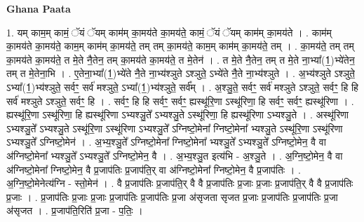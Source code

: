 \documentclass[17pt]{extarticle}
\begin{document}
\textbf{Ghana Paata } \newline

1. यम् काम॒म् कामं॒ ॅयं ॅयम् काम॑म् का॒मय॑ते का॒मय॑ते॒ कामं॒ ॅयं ॅयम् काम॑म् का॒मय॑ते । . काम॑म् का॒मय॑ते का॒मय॑ते॒ काम॒म् काम॑म् का॒मय॑ते॒ तम् तम् का॒मय॑ते॒ काम॒म् काम॑म् का॒मय॑ते॒ तम् । . का॒मय॑ते॒ तम् तम् का॒मय॑ते का॒मय॑ते॒ त मे॒ते नै॒तेन॒ तम् का॒मय॑ते का॒मय॑ते॒ त मे॒तेन॑ । . त मे॒ते नै॒तेन॒ तम् त मे॒ते ना॒भ्या᳚(1॒)भ्ये॑तेन॒ तम् त मे॒तेना॒भि । . ए॒तेना॒भ्या᳚(1॒)भ्ये॑ते नै॒ते ना॒भ्य॑श्ञुते ऽश्ञुते॒ ऽभ्ये॑ते नै॒ते ना॒भ्य॑श्ञुते । . अ॒भ्य॑श्ञुते ऽश्ञुते॒ ऽभ्या᳚(1॒)भ्य॑श्ञुते॒ सर्वꣳ॒॒ सर्व॑ मश्ञुते॒ ऽभ्या᳚(1॒)भ्य॑श्ञुते॒ सर्व᳚म् । . अ॒श्ञु॒ते॒ सर्वꣳ॒॒ सर्व॑ मश्ञुते ऽश्ञुते॒ सर्वꣳ॒॒ हि हि सर्व॑ मश्ञुते ऽश्ञुते॒ सर्वꣳ॒॒ हि । . सर्वꣳ॒॒ हि हि सर्वꣳ॒॒ सर्वꣳ॒॒ ह्यस्थू॑रि॒णा ऽस्थू॑रिणा॒ हि सर्वꣳ॒॒ सर्वꣳ॒॒ ह्यस्थू॑रिणा । . ह्यस्थू॑रि॒णा ऽस्थू॑रिणा॒ हि ह्यस्थू॑रिणा ऽभ्यश्ञु॒ते᳚ ऽभ्यश्ञु॒ते ऽस्थू॑रिणा॒ हि ह्यस्थू॑रिणा ऽभ्यश्ञु॒ते । . अस्थू॑रिणा ऽभ्यश्ञु॒ते᳚ ऽभ्यश्ञु॒ते ऽस्थू॑रि॒णा ऽस्थू॑रिणा ऽभ्यश्ञु॒ते᳚ ऽग्निष्टो॒मेना᳚ ग्निष्टो॒मेना᳚ भ्यश्ञु॒ते ऽस्थू॑रि॒णा ऽस्थू॑रिणा ऽभ्यश्ञु॒ते᳚ ऽग्निष्टो॒मेन॑ । . अ॒भ्य॒श्ञु॒ते᳚ ऽग्निष्टो॒मेना᳚ ग्निष्टो॒मेना᳚ भ्यश्ञु॒ते᳚ ऽभ्यश्ञु॒ते᳚ ऽग्निष्टो॒मेन॒ वै वा अ॑ग्निष्टो॒मेना᳚ भ्यश्ञु॒ते᳚ ऽभ्यश्ञु॒ते᳚ ऽग्निष्टो॒मेन॒ वै । . अ॒भ्य॒श्ञु॒त इत्य॑भि - अ॒श्ञु॒ते । . अ॒ग्नि॒ष्टो॒मेन॒ वै वा अ॑ग्निष्टो॒मेना᳚ ग्निष्टो॒मेन॒ वै प्र॒जाप॑तिः प्र॒जाप॑ति॒र् वा अ॑ग्निष्टो॒मेना᳚ ग्निष्टो॒मेन॒ वै प्र॒जाप॑तिः । . अ॒ग्नि॒ष्टो॒मेनेत्य॑ग्नि - स्तो॒मेन॑ । . वै प्र॒जाप॑तिः प्र॒जाप॑ति॒र् वै वै प्र॒जाप॑तिः प्र॒जाः प्र॒जाः प्र॒जाप॑ति॒र् वै वै प्र॒जाप॑तिः प्र॒जाः । . प्र॒जाप॑तिः प्र॒जाः प्र॒जाः प्र॒जाप॑तिः प्र॒जाप॑तिः प्र॒जा अ॑सृजता सृजत प्र॒जाः प्र॒जाप॑तिः प्र॒जाप॑तिः प्र॒जा अ॑सृजत । . प्र॒जाप॑ति॒रिति॑ प्र॒जा - प॒तिः॒ । \newline
\end{document}
